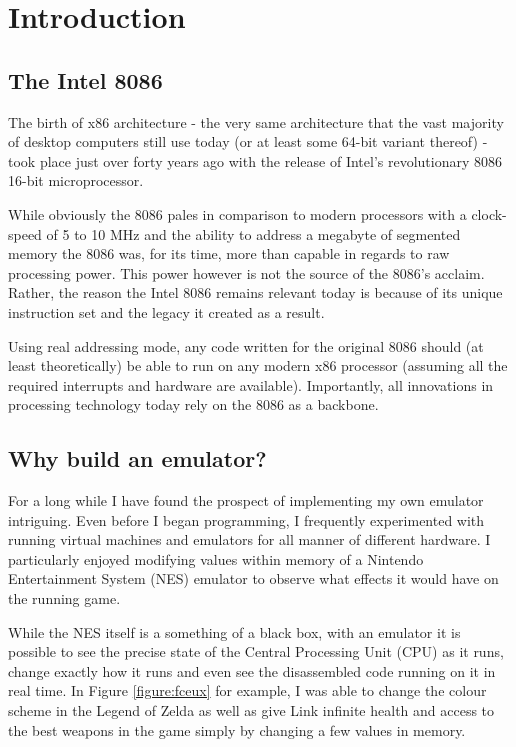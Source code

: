 \section{Introduction}

\subsection{The Intel 8086}
    The birth of x86 architecture - the very same architecture that the vast majority of desktop computers still use today (or at least some 64-bit variant thereof) - took place just over forty years ago with the release of Intel's revolutionary 8086 16-bit microprocessor.

    While obviously the 8086 pales in comparison to modern processors with a clock-speed of 5 to 10 MHz and the ability to address a megabyte of segmented memory the 8086 was, for its time, more than capable in regards to raw processing power. This power however is not the source of the 8086's acclaim. Rather, the reason the Intel 8086 remains relevant today is because of its unique instruction set and the legacy it created as a result.

    Using real addressing mode, any code written for the original 8086 should (at least theoretically) be able to run on any modern x86 processor (assuming all the required interrupts and hardware are available). Importantly, all innovations in processing technology today rely on the 8086 as a backbone.

\subsection{Why build an emulator?}
    For a long while I have found the prospect of implementing my own emulator intriguing. Even before I began programming, I frequently experimented with running virtual machines and emulators for all manner of different hardware. I particularly enjoyed modifying values within memory of a Nintendo Entertainment System (NES) emulator to observe what effects it would have on the running game.

    While the NES itself is a something of a black box, with an emulator it is possible to see the precise state of the Central Processing Unit (CPU) as it runs, change exactly how it runs and even see the disassembled code running on it in real time. In Figure \ref{figure:fceux} for example, I was able to change the colour scheme in the Legend of Zelda as well as give Link infinite health and access to the best weapons in the game simply by changing a few values in memory.

